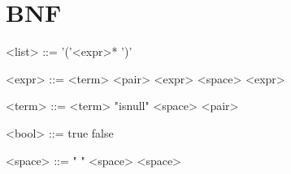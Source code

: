\documentclass[]{article}
\date{May 05, 2017}
\begin{document}
  \section{BNF}
  \setlength{\grammarparsep}{20pt}
  \setlength{\grammarindent}{8em}
  \begin{grammar}
    
    <list>    ::= '('<expr>* ')'

    <expr>    ::=  <term>
              \alt <pair>
              \alt <expr> <space> <expr>

    <term>    ::=  <term>
              \alt "isnull" <space> <pair>

    <bool>    ::=  true 
              \alt false 

    <space>   ::=  " "
              \alt <space> <space>
  \end{grammar}
\end{document}
